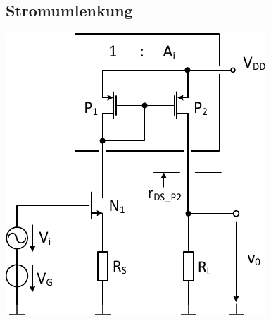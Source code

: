 

\subsection{Stromumlenkung}

\begin{minipage}[t]{0.3\columnwidth}
    \includegraphics[width=\columnwidth, align=t]{images/07_verstaerker_mit_stromumlenkung.pdf}
\end{minipage}
\hfill
